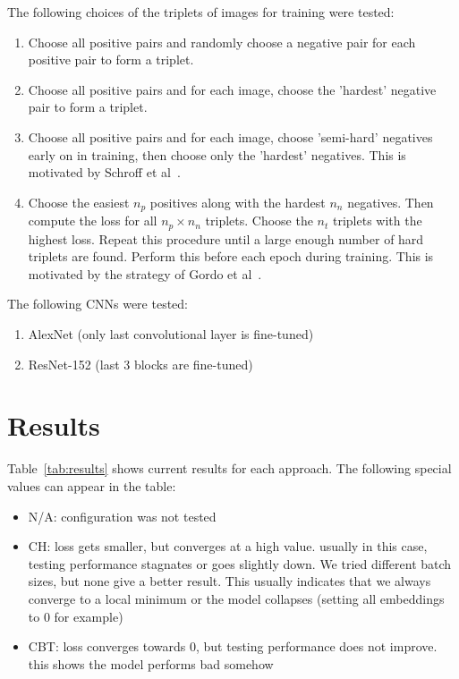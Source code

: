\documentclass[fleqn]{article}
\begin{document}
The following choices of the triplets of images for training were tested:
\begin{enumerate}
    \item Choose all positive pairs and randomly choose a negative pair
    for each positive pair to form a triplet.
    \item Choose all positive pairs and for each image, choose the
    'hardest' negative pair to form a triplet.
    \item Choose all positive pairs and for each image, choose 'semi-hard'
    negatives early on in training, then choose only the 'hardest'
    negatives. This is motivated by Schroff et al~\cite{schroff_facenet:_2015}.
    \item Choose the easiest $n_p$ positives along with the
    hardest $n_n$ negatives. Then compute the loss for all $n_p\times n_n$
    triplets. Choose the $n_t$ triplets with the highest loss.
    Repeat this procedure until a large enough number of hard triplets
    are found. Perform this before each epoch during training.
    This is motivated by the strategy of Gordo et al~\cite{gordo_deep_2016}.
\end{enumerate}

The following CNNs were tested:
\begin{enumerate}
    \item AlexNet (only last convolutional layer is fine-tuned)
    \item ResNet-152 (last 3 blocks are fine-tuned)
\end{enumerate}

\section{Results}
Table~\ref{tab:results} shows current results for each approach.
The following special values can appear in the table:
\begin{itemize}
    \item N/A: configuration was not tested
    \item CH: loss gets smaller, but converges at a high value.
    usually in this case, testing performance stagnates or goes slightly down.
    We tried different batch sizes, but none give a better result.
    This usually indicates that we always converge to a local minimum
    or the model collapses (setting all embeddings to 0 for example)
    \item CBT: loss converges towards 0, but testing performance does
    not improve. this shows the model performs bad somehow
\end{itemize}
\end{document}
